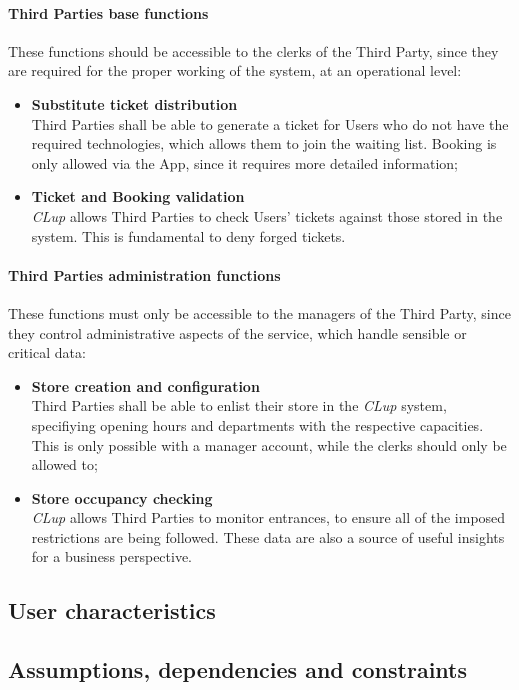 \paragraph{Third Parties base functions}
    These functions should be accessible to the clerks of the Third Party, since they are required for the proper working of the system, at an operational level:
\begin{itemize}
    \item\textbf{Substitute ticket distribution}\\
    Third Parties shall be able to generate a ticket for Users who do not have the required technologies, which allows them to join the waiting list. Booking is only allowed via the App, since it requires more detailed information;
    \item\textbf{Ticket and Booking validation}\\
    \emph{CLup} allows Third Parties to check Users' tickets against those stored in the system. This is fundamental to deny forged tickets.
\end{itemize}    
\paragraph{Third Parties administration functions}
These functions must only be accessible to the managers of the Third Party, since they control administrative aspects of the service, which handle sensible or critical data:
\begin{itemize}
    \item\textbf{Store creation and configuration}\\
    Third Parties shall be able to enlist their store in the \emph{CLup} system, specifiying opening hours and departments with the respective capacities. This is only possible with a manager account, while the clerks should only be allowed to;
    \item\textbf{Store occupancy checking}\\
    \emph{CLup} allows Third Parties to monitor entrances, to ensure all of the imposed restrictions are being followed. These data are also a source of useful insights for a business perspective.
\end{itemize}
\subsection{User characteristics}
\subsection{Assumptions, dependencies and constraints}
